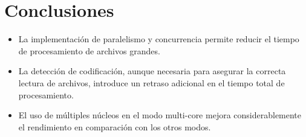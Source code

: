 \documentclass[a4paper,12pt]{report}
\begin{document}
\chapter{Conclusiones}
\begin{itemize}
    \item La implementación de paralelismo y concurrencia permite reducir el tiempo de procesamiento de archivos grandes.
    \item La detección de codificación, aunque necesaria para asegurar la correcta lectura de archivos, introduce un retraso adicional en el tiempo total de procesamiento.
    \item El uso de múltiples núcleos en el modo multi-core mejora considerablemente el rendimiento en comparación con los otros modos.
\end{itemize}
\end{document}
